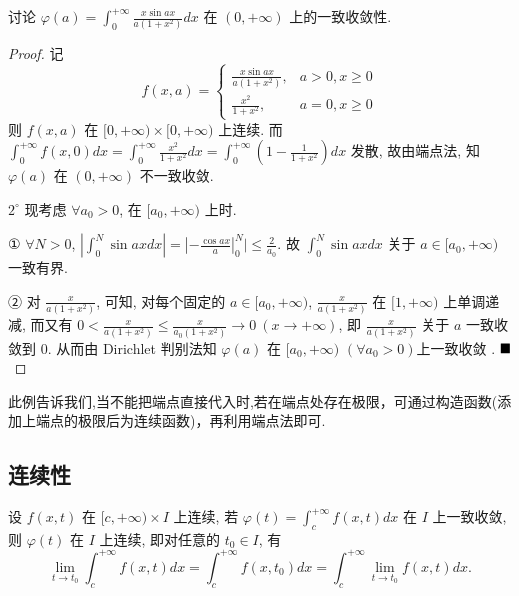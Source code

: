 \documentclass[lang=cn,newtx,10pt,scheme=chinese]{elegantbook}
\begin{document}
\begin{example}[$\bigstar \bigstar$]
讨论 $\varphi(a) = \int_{0}^{+\infty} \frac{x \sin a x}{a(1+x^2)} dx$ 在 $(0, +\infty)$ 上的一致收敛性.
\end{example}

\begin{proof}
记
$$ f(x,a) = \begin{cases} \frac{x \sin ax}{a(1+x^2)}, & a > 0, x \ge 0 \\ \frac{x^2}{1+x^2}, & a=0, x \ge 0 \end{cases} $$
则 $f(x,a)$ 在 $[0, +\infty) \times [0, +\infty)$ 上连续.
而 $\int_{0}^{+\infty} f(x,0) dx = \int_{0}^{+\infty} \frac{x^2}{1+x^2} dx = \int_{0}^{+\infty} (1 - \frac{1}{1+x^2}) dx$ 发散, 故由端点法, 知 $\varphi(a)$ 在 $(0, +\infty)$ 不一致收敛.

$2^{\circ}$ 现考虑 $\forall a_0 > 0$, 在 $[a_0, +\infty)$ 上时.

① $\forall N > 0$, $|\int_0^N \sin ax dx| = |-\frac{\cos ax}{a}|_0^N| \le \frac{2}{a_0}$. 故 $\int_0^N \sin ax dx$ 关于 $a \in [a_0, +\infty)$ 一致有界.

② 对 $\frac{x}{a(1+x^2)}$, 可知, 对每个固定的 $a \in [a_0, +\infty)$, $\frac{x}{a(1+x^2)}$ 在 $[1, +\infty)$ 上单调递减,
而又有 $0 < \frac{x}{a(1+x^2)} \le \frac{x}{a_0(1+x^2)} \to 0 \ (x \to +\infty)$, 即 $\frac{x}{a(1+x^2)}$ 关于 $a$ 一致收敛到 0.
从而由 Dirichlet 判别法知 $\varphi(a)$ 在 $[a_0, +\infty)$ $(\forall a_0 > 0)$上一致收敛 .
$\hfill \blacksquare$
\end{proof}

\begin{note}
    此例告诉我们,当不能把端点直接代入时,若在端点处存在极限，可通过构造函数(添加上端点的极限后为连续函数)，再利用端点法即可.
\end{note}
\subsection{连续性}
\begin{theorem}[连续性]\label{含参变量反常积分_连续性定理}
设 $f(x, t)$ 在 $[c, +\infty) \times I$ 上连续, 若 $\varphi(t) = \int_{c}^{+\infty} f(x, t) dx$ 在 $I$ 上一致收敛, 则 $\varphi(t)$ 在 $I$ 上连续, 即对任意的 $t_0 \in I$, 有
$$ \lim\limits_{t \to t_0} \int_{c}^{+\infty} f(x, t) dx = \int_{c}^{+\infty} f(x, t_0) dx = \int_{c}^{+\infty} \lim\limits_{t \to t_0} f(x, t) dx. $$
\end{theorem}
\end{document}
